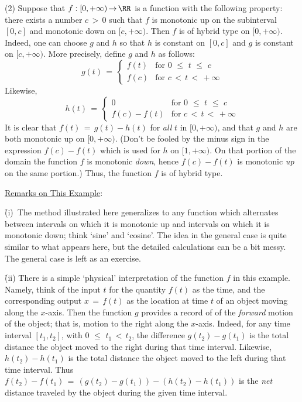         (2) Suppose that $f:[0,+{\infty}) \,{\rightarrow}\, {\RR}$ is a function with the following property:
    there exists a number $c\,>\,0$ such that $f$ is monotonic up on the subinterval $[0,c]$ and monotonic down on $[c,+{\infty})$.
    Then $f$ is of hybrid type on $[0,+{\infty})$.
    Indeed, one can choose $g$ and $h$ so that $h$ is constant on $[0,c]$ and $g$ is constant on $[c,+{\infty})$.
    More precisely, define $g$ and $h$ as follows:
        \begin{displaymath}
        g(t) \,=\, 
                    \left\{
        \begin{array}{ll}
        f(t) & \mbox{for $0\,\,{\leq}\,\,t\,\,{\leq}\,\,c$} \\
        f(c) & \mbox{for $c\,<\,t\,<\,+{\infty}$}
        \end{array}
                    \right.
        \end{displaymath}
    Likewise,
        \begin{displaymath}
        h(t) \,=\, 
                    \left\{
        \begin{array}{cl}
         0 & \mbox{for $0\,\,{\leq}\,\,t\,\,{\leq}\,\,c$} \\
        f(c)-f(t) & \mbox{for $c\,<\,t\,<\,+{\infty}$}
        \end{array}
                    \right.
        \end{displaymath}
    It is clear that $f(t) \,=\, g(t)-h(t)$ for {\em all} $t$ in $[0,+{\infty})$, and that $g$ and $h$ are both monotonic up on $[0,+{\infty})$.
    (Don't be fooled by the minus sign in the expression $f(c)-f(t)$ which is used for $h$ on $[1,+{\infty})$.
    On that portion of the domain the function $f$ is monotonic {\em down}, hence $f(c)-f(t)$ is monotonic {\em up} on the same portion.)
    Thus, the function $f$ is of hybrid type.

        \underline{Remarks on This Example}:

        \h (i)\, The method illustrated here generalizes to any function which alternates between intervals on which it is monotonic up and intervals on which it is monotonic down;
    think `sine' and `cosine'.
    The idea in the general case is quite similar to what appears here, but the detailed calculations can be a bit messy.
    The general case is left as an exercise.

       \h (ii) There is a simple `physical' interpretation of the function $f$ in this example.
    Namely, think of the input $t$ for the quantity $f(t)$ as the time, and the corresponding output $x \,=\, f(t)$ as the location at time $t$ of an object moving along the $x$-axis.
    Then the function $g$ provides a record of of the {\em forward} motion of the object; that is, motion to the right along the $x$-axis.
    Indeed, for any time interval $[t_{1},t_{2}]$,
    with $0\,\,{\leq}\,\,t_{1}\,<\,t_{2}$, the difference $g(t_{2})-g(t_{1})$ is the total distance the object moved to the right during that time interval.
    Likewise, $h(t_{2})-h(t_{1})$ is the total distance the object moved to the left during that time interval.
    Thus $f(t_{2}) - f(t_{1})  \,=\, (g(t_{2}) - g(t_{1})) - (h(t_{2}) - h(t_{1}))$ is the {\em net} distance traveled by the object during the given time interval.

